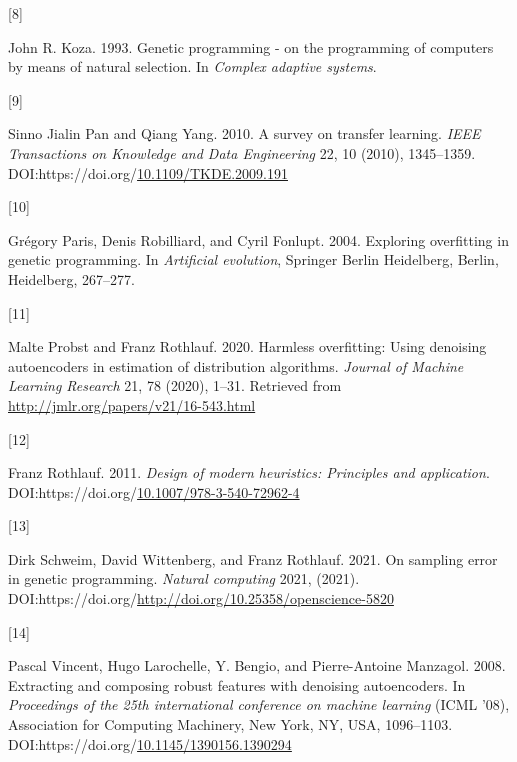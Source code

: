 \documentclass[
  11pt,
]{article}
\newlength{\cslhangindent}
\newlength{\csllabelwidth}
\newlength{\cslentryspacingunit} %
\newenvironment{CSLReferences}[2] %
 {%
  \setlength{\parindent}{0pt}
  \ifodd #1
  \let\oldpar\par
  \def\par{\hangindent=\cslhangindent\oldpar}
  \fi
  \setlength{\parskip}{#2\cslentryspacingunit}
 }%
 {}
\newcommand{\CSLLeftMargin}[1]{\parbox[t]{\csllabelwidth}{#1}}
\newcommand{\CSLRightInline}[1]{\parbox[t]{\linewidth - \csllabelwidth}{#1}\break}
\begin{document}
\begin{CSLReferences}{0}{0}
\leavevmode{}%
\CSLLeftMargin{{[}8{]} }%
\CSLRightInline{John R. Koza. 1993. Genetic programming - on the programming of computers by means of natural selection. In \emph{Complex adaptive systems}.}

\leavevmode{}%
\CSLLeftMargin{{[}9{]} }%
\CSLRightInline{Sinno Jialin Pan and Qiang Yang. 2010. A survey on transfer learning. \emph{IEEE Transactions on Knowledge and Data Engineering} 22, 10 (2010), 1345--1359. DOI:https://doi.org/\href{https://doi.org/10.1109/TKDE.2009.191}{10.1109/TKDE.2009.191}}

\leavevmode{}%
\CSLLeftMargin{{[}10{]} }%
\CSLRightInline{Grégory Paris, Denis Robilliard, and Cyril Fonlupt. 2004. Exploring overfitting in genetic programming. In \emph{Artificial evolution}, Springer Berlin Heidelberg, Berlin, Heidelberg, 267--277.}

\leavevmode{}%
\CSLLeftMargin{{[}11{]} }%
\CSLRightInline{Malte Probst and Franz Rothlauf. 2020. Harmless overfitting: Using denoising autoencoders in estimation of distribution algorithms. \emph{Journal of Machine Learning Research} 21, 78 (2020), 1--31. Retrieved from \url{http://jmlr.org/papers/v21/16-543.html}}

\leavevmode{}%
\CSLLeftMargin{{[}12{]} }%
\CSLRightInline{Franz Rothlauf. 2011. \emph{Design of modern heuristics: Principles and application}. DOI:https://doi.org/\href{https://doi.org/10.1007/978-3-540-72962-4}{10.1007/978-3-540-72962-4}}

\leavevmode{}%
\CSLLeftMargin{{[}13{]} }%
\CSLRightInline{Dirk Schweim, David Wittenberg, and Franz Rothlauf. 2021. On sampling error in genetic programming. \emph{Natural computing} 2021, (2021). DOI:https://doi.org/\url{http://doi.org/10.25358/openscience-5820}}

\leavevmode{}%
\CSLLeftMargin{{[}14{]} }%
\CSLRightInline{Pascal Vincent, Hugo Larochelle, Y. Bengio, and Pierre-Antoine Manzagol. 2008. Extracting and composing robust features with denoising autoencoders. In \emph{Proceedings of the 25th international conference on machine learning} (ICML '08), Association for Computing Machinery, New York, NY, USA, 1096--1103. DOI:https://doi.org/\href{https://doi.org/10.1145/1390156.1390294}{10.1145/1390156.1390294}}


\end{CSLReferences}
\end{document}
